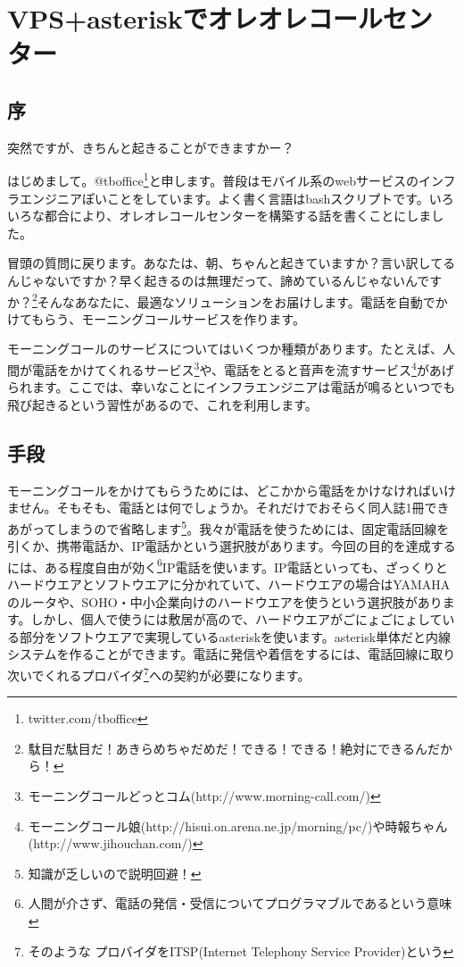 \section{VPS+asteriskでオレオレコールセンター}
\subsection{序}

\begin{screen}
 \begin{center}
突然ですが、きちんと起きることができますかー？
\end{center}
\end{screen}

はじめまして。@tboffice\footnote{twitter.com/tboffice}と申します。普段はモバイル系のwebサービスのインフラエンジニアぽいことをしています。よく書く言語はbashスクリプトです。いろいろな都合により、オレオレコールセンターを構築する話を書くことにしました。

冒頭の質問に戻ります。あなたは、朝、ちゃんと起きていますか？言い訳してるんじゃないですか？早く起きるのは無理だって、諦めているんじゃないんですか？\footnote{駄目だ駄目だ！あきらめちゃだめだ！できる！できる！絶対にできるんだから！}そんなあなたに、最適なソリューションをお届けします。電話を自動でかけてもらう、モーニングコールサービスを作ります。

モーニングコールのサービスについてはいくつか種類があります。たとえば、人間が電話をかけてくれるサービス\footnote{モーニングコールどっとコム(http://www.morning-call.com/)}や、電話をとると音声を流すサービス\footnote{モーニングコール娘(http://hisui.on.arena.ne.jp/morning/pc/)や時報ちゃん(http://www.jihouchan.com/)}があげられます。ここでは、幸いなことにインフラエンジニアは電話が鳴るといつでも飛び起きるという習性があるので、これを利用します。

\subsection{手段}
モーニングコールをかけてもらうためには、どこかから電話をかけなければいけません。そもそも、電話とは何でしょうか。それだけでおそらく同人誌1冊できあがってしまうので省略します\footnote{知識が乏しいので説明回避！}。我々が電話を使うためには、固定電話回線を引くか、携帯電話か、IP電話かという選択肢があります。今回の目的を達成するには、ある程度自由が効く\footnote{人間が介さず、電話の発信・受信についてプログラマブルであるという意味}IP電話を使います。IP電話といっても、ざっくりとハードウエアとソフトウエアに分かれていて、ハードウエアの場合はYAMAHAのルータや、SOHO・中小企業向けのハードウエアを使うという選択肢があります。しかし、個人で使うには敷居が高ので、ハードウエアがごにょごにょしている部分をソフトウエアで実現しているasteriskを使います。asterisk単体だと内線システムを作ることができます。電話に発信や着信をするには、電話回線に取り次いでくれるプロバイダ\footnote{そのような
プロバイダをITSP(Internet Telephony Service Provider)という}への契約が必要になります。

